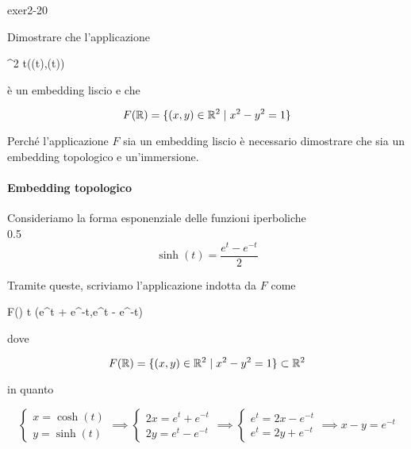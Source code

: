 {exer2-20}
{
Dimostrare che l'applicazione

	{\R}{\R^{2}}
	{t}{(\cosh(t),\sinh(t))}

è un embedding liscio e che

\begin{equation}
	F(\mathbb{R}) = \{ (x,y) \in \mathbb{R}^{2} \mid x^{2}-y^{2} = 1 \}
\end{equation}
}
{
Perché l'applicazione $ F $ sia un embedding liscio è necessario dimostrare che sia un embedding topologico e un'immersione.

\paragraph{Embedding topologico}

Consideriamo la forma esponenziale delle funzioni iperboliche \\

	{0.5}{%
			\begin{equation}
				\sinh(t) = \dfrac{e^{t} - e^{-t}}{2}
			\end{equation}
			}

Tramite queste, scriviamo l'applicazione indotta da $ F $ come

	{\R}{F(\R)}
	{t}{ (e^{t} + e^{-t},e^{t} - e^{-t})}

dove

\begin{equation}
	F(\mathbb{R}) = \{ (x,y) \in \mathbb{R}^{2} \mid x^{2} - y^{2} = 1 \} \subset \mathbb{R}^{2}
\end{equation}

in quanto

\begin{equation}
	\begin{cases}
		x = \cosh(t) \\
		y = \sinh(t)
	\end{cases} %
	\implies %
	\begin{cases}
		2 x = e^{t} + e^{-t} \\
		2 y = e^{t} - e^{-t}
	\end{cases} %
	\implies %
	\begin{cases}
		e^{t} = 2 x - e^{-t} \\
		e^{t} = 2 y + e^{-t}
	\end{cases} %
	\implies %
	x - y = e^{-t}
\end{equation}

}
